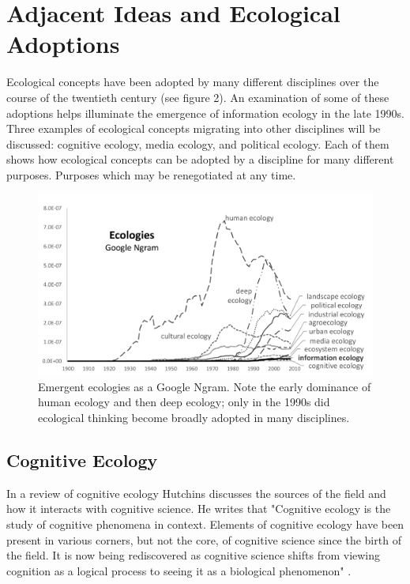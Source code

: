 \section{Adjacent Ideas and Ecological Adoptions}

Ecological concepts have been adopted by many different disciplines over the course of the twentieth century (see figure 2). An examination of some of these adoptions helps illuminate the emergence of information ecology in the late 1990s. Three examples of ecological concepts migrating into other disciplines will be discussed: cognitive ecology, media ecology, and political ecology. Each of them shows how ecological concepts can be adopted by a discipline for many different purposes. Purposes which may be renegotiated at any time.

\begin{figure}[!ht]
  \centering
    \includegraphics[width=5.5in]{figures/ecologiesAll}
  \caption{Emergent ecologies as a Google Ngram. Note the early dominance of human ecology and then deep ecology; only in the 1990s did ecological thinking become broadly adopted in many disciplines.}
\end{figure}

\subsection{Cognitive Ecology}

In a review of cognitive ecology Hutchins \citep{hutchins_cognitive_2010} discusses the sources of the field and how it interacts with cognitive science. He writes that "Cognitive ecology is the study of cognitive phenomena in context. Elements of cognitive ecology have been present in various corners, but not the core, of cognitive science since the birth of the field. It is now being rediscovered as cognitive science shifts from viewing cognition as a logical process to seeing it as a biological phenomenon" \citep[][p. 705]{hutchins_cognitive_2010}. 

